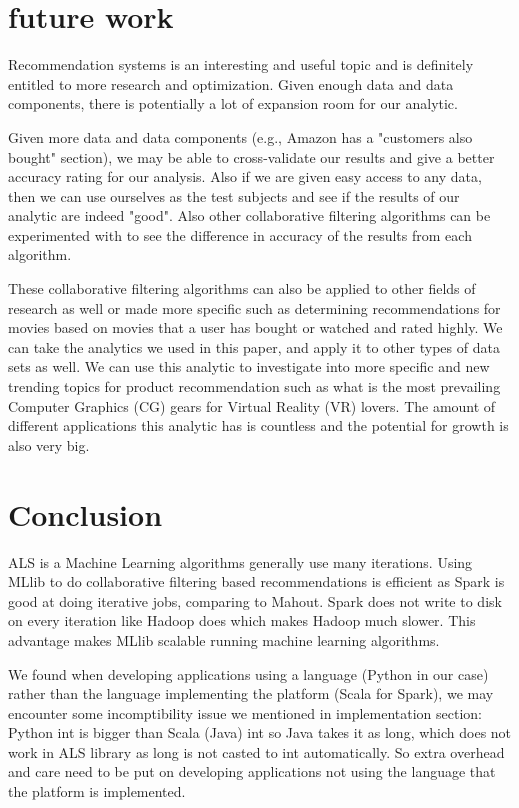\documentclass[conference]{IEEEtran}
\begin{document}
\begin{lstlisting}
\end{lstlisting}


\section{future work}
Recommendation systems is an interesting and useful topic and is definitely entitled to more research and optimization.  Given enough data and data components, there is potentially a lot of expansion room for our analytic.  

Given more data and data components (e.g., Amazon has a "customers also bought" section), we may be able to cross-validate our results and give a better accuracy rating for our analysis.  Also if we are given easy access to any data, then we can use ourselves as the test subjects and see if the results of our analytic are indeed "good".  Also other collaborative filtering algorithms can be experimented with to see the difference in accuracy of the results from each algorithm.  

These collaborative filtering algorithms can also be applied to other fields of research as well or made more specific such as determining recommendations for movies based on movies that a user has bought or watched and rated highly.  We can take the analytics we used in this paper, and apply it to other types of data sets as well.  We can use this analytic to investigate into more specific and new trending topics for product recommendation such as what is the most prevailing Computer Graphics (CG) gears for Virtual Reality (VR) lovers.  The amount of different applications this analytic has is countless and the potential for growth is also very big.

\section{Conclusion}

ALS is a Machine Learning algorithms generally use many iterations. Using MLlib to do collaborative filtering based recommendations is efficient as Spark is good at doing iterative jobs, comparing to Mahout. Spark does not write to disk on every iteration like Hadoop does which makes Hadoop much slower. This advantage makes MLlib scalable running machine learning algorithms. 

We found when developing applications using a language (Python in our case) rather than the language implementing the platform (Scala for Spark), we may encounter some incomptibility issue we mentioned in implementation section: Python int is bigger than Scala (Java) int so Java takes it as long, which does not work in ALS library as long is not casted to int automatically. So extra overhead and care need to be put on developing applications not using the language that the platform is implemented. 
\end{document}
